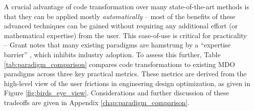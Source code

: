 A crucial advantage of code transformation over many state-of-the-art methods is that they can be applied mostly \textit{automatically} -- most of the benefits of these advanced techniques can be gained without requiring any additional effort (or mathematical expertise) from the user. This ease-of-use is critical for practicality -- Grant notes that many existing paradigms are hamstrung by a ``expertise barrier'' \cite{grant_disciplined_2006}, which inhibits industry adoption. To assess this further, Table \ref{tab:paradigm_comparison} compares code transformations to existing MDO paradigms across three key practical metrics. These metrics are derived from the high-level view of the user frictions in engineering design optimization, as given in Figure \ref{fig:birds_eye_view}. Considerations and further discussion of these tradeoffs are given in Appendix \ref{chap:paradigm_comparison}.


